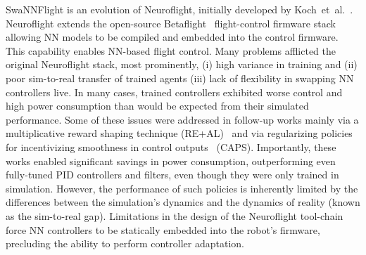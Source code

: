 \documentclass[letterpaper, 10 pt, conference]{ieeeconf} %
\newcommand{\firmware}{SwaNNFlight}
\begin{document}
    \firmware{} is an evolution of Neuroflight, initially developed by Koch~et~al.~\cite{NFori, NFv2}.
    Neuroflight extends the open-source Betaflight~\cite{betaflight-homepage} flight-control firmware stack allowing NN models to be compiled and embedded into the control firmware.
    This capability enables NN-based flight control.
    Many problems afflicted the original Neuroflight stack, most prominently, (i) high variance in training and (ii) poor sim-to-real transfer of trained agents (iii) lack of flexibility in swapping NN controllers live.
    In many cases, trained controllers exhibited worse control and high power consumption than would be expected from their simulated performance. 
    Some of these issues were addressed in follow-up works mainly via a multiplicative reward shaping technique (RE+AL)~\cite{mysore2021train} and via regularizing policies for incentivizing smoothness in control outputs~\cite{mysore2021caps} (CAPS).
    Importantly, these works enabled significant savings in power consumption, outperforming even fully-tuned PID controllers and filters, even though they were only trained in simulation.
    However, the performance of such policies is inherently limited by the differences between the simulation's dynamics and the dynamics of reality (known as the sim-to-real gap).
    Limitations in the design of the Neuroflight tool-chain force NN controllers to be statically embedded into the robot's firmware, precluding the ability to perform controller adaptation.
    
\end{document}
